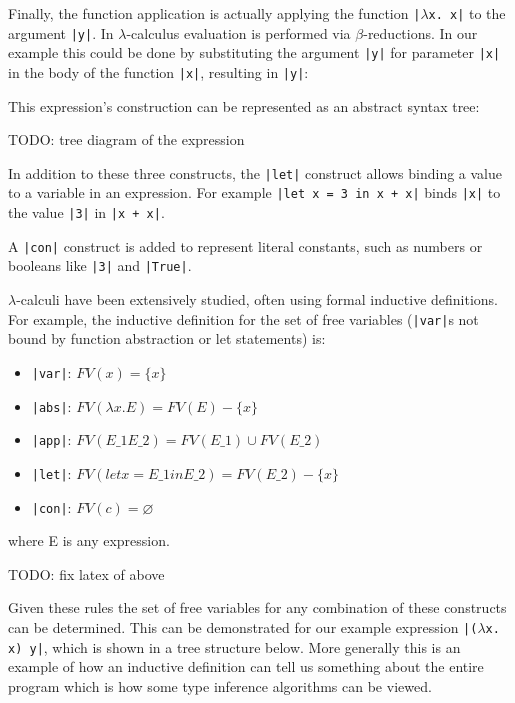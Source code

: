 \documentclass[a4paper,fleqn,12pt]{article}
\begin{document}
Finally, the function application is actually applying the function \texttt{|$\lambda$x. x|} to the argument \texttt{|y|}. In $\lambda$-calculus evaluation is performed via $\beta$-reductions. In our example this could be done by substituting the argument \texttt{|y|} for parameter \texttt{|x|} in the body of the function \texttt{|x|}, resulting in \texttt{|y|}:

This expression’s construction can be represented as an abstract syntax tree:

TODO: tree diagram of the expression

In addition to these three constructs, the \texttt{|let|} construct allows binding a value to a variable in an expression. For example \texttt{|let x = 3 in x + x|} binds \texttt{|x|} to the value \texttt{|3|} in \texttt{|x + x|}.

A \texttt{|con|} construct is added to represent literal constants, such as numbers or booleans like \texttt{|3|} and \texttt{|True|}.

$\lambda$-calculi have been extensively studied, often using formal inductive definitions. For example, the inductive definition for the set of free variables (\texttt{|var|}s not bound by function abstraction or let statements) is:
\begin{itemize}
  \item \texttt{|var|}: $FV(x) = \{ x \}$
  \item \texttt{|abs|}: $FV(\lambda x. E) = FV(E) - \{ x \}$
  \item \texttt{|app|}: $FV(E\_1 E\_2) = FV(E\_1) \cup FV(E\_2)$
  \item \texttt{|let|}: $FV(let x = E\_1 in E\_2) = FV(E\_2) - \{ x \}$
  \item \texttt{|con|}: $FV(c) = \varnothing$
\end{itemize}
where E is any expression.

TODO: fix latex of above

Given these rules the set of free variables for any combination of these constructs can be determined. This can be demonstrated for our example expression \texttt{|($\lambda$x. x) y|}, which is shown in a tree structure below. More generally this is an example of how an inductive definition can tell us something about the entire program which is how some type inference algorithms can be viewed.
\end{document}
